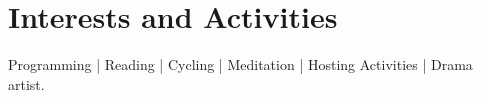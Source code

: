 \documentclass[a4paper,10pt]{article} %
\begin{document}

\section{Interests and Activities}

Programming \: |\: Reading \: |\: Cycling \: |\: Meditation \: |\: Hosting Activities \: |\:  Drama artist. \\


\newpage
\end{document}
